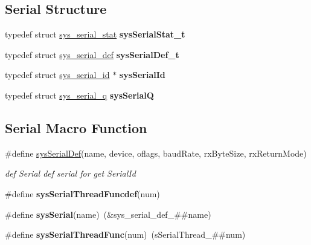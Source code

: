 \subsection*{Serial Structure}
\begin{DoxyCompactItemize}
\item 
\mbox{\label{group__SYSTEM__SERIAL__COMM_gae2b8f8d40db50a365f1d32cdfd539428}} 
typedef struct \hyperlink{structsys__serial__stat}{sys\+\_\+serial\+\_\+stat} {\bfseries sys\+Serial\+Stat\+\_\+t}
\item 
\mbox{\label{group__SYSTEM__SERIAL__COMM_gaa97ac9544ab815d09f1153c2715bee92}} 
typedef struct \hyperlink{structsys__serial__def}{sys\+\_\+serial\+\_\+def} {\bfseries sys\+Serial\+Def\+\_\+t}
\item 
\mbox{\label{group__SYSTEM__SERIAL__COMM_ga3fa14f9fe3f2c72c4889c51df638e51d}} 
typedef struct \hyperlink{structsys__serial__id}{sys\+\_\+serial\+\_\+id} $\ast$ {\bfseries sys\+Serial\+Id}
\item 
\mbox{\label{group__SYSTEM__SERIAL__COMM_gaa194b6d4fd7457e2ecc053387b0d15fd}} 
typedef struct \hyperlink{structsys__serial__q}{sys\+\_\+serial\+\_\+q} {\bfseries sys\+SerialQ}
\end{DoxyCompactItemize}
\subsection*{Serial Macro Function}
\begin{DoxyCompactItemize}
\item 
\#define \hyperlink{group__SYSTEM__SERIAL__COMM_ga0e2406f7554f78b285eaccd1513fe392}{sys\+Serial\+Def}(name,  device,  oflags,  baud\+Rate,  rx\+Byte\+Size,  rx\+Return\+Mode)
\begin{DoxyCompactList}\small\item\em def Serial def serial for get Serial\+Id \end{DoxyCompactList}\item 
\#define {\bfseries sys\+Serial\+Thread\+Funcdef}(num)
\item 
\mbox{\label{group__SYSTEM__SERIAL__COMM_ga045c8c8025b6e2de3de32a5315da2766}} 
\#define {\bfseries sys\+Serial}(name)~(\&sys\+\_\+serial\+\_\+def\+\_\+\#\#name)
\item 
\mbox{\label{group__SYSTEM__SERIAL__COMM_ga7aed45ffffd42f5cd8fa50f8ae3af2cd}} 
\#define {\bfseries sys\+Serial\+Thread\+Func}(num)~(s\+Serial\+Thread\+\_\+\#\#num)
\end{DoxyCompactItemize}
